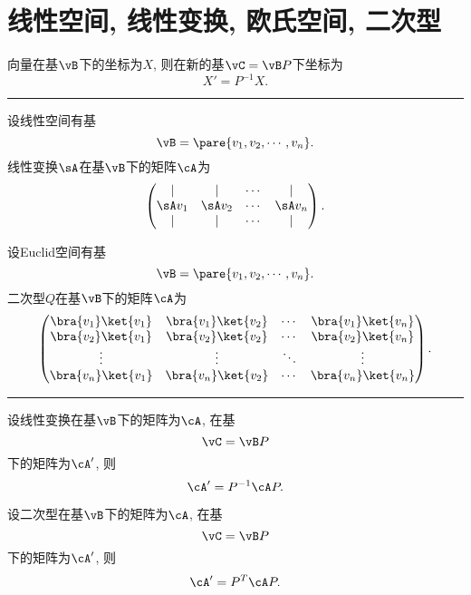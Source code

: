 \documentclass{ctexart}
\begin{document}
\section{线性空间, 线性变换, 欧氏空间, 二次型} %
\label{sec:线性空间_线性变换_欧氏空间_二次型}

\begin{theorem}
    向量在基$\vB$下的坐标为$X$, 则在新的基$\vC = \vB P$下坐标为
    \[ X' = P^{-1}X. \]
\end{theorem}

\hrule

\begin{paracol}{2}

    \begin{theorem}
        设线性空间有基
        \[ \vB=\pare{v_1,v_2,\cdots,v_n}. \]
        线性变换$\sA$在基$\vB$下的矩阵$\cA$为
        \[ \begin{pmatrix}
            \vert & \vert & \cdots & \vert \\
            \sA v_1 & \sA v_2 & \cdots & \sA v_n \\
            \vert & \vert & \cdots & \vert
        \end{pmatrix}. \]
    \end{theorem}

\switchcolumn

    \begin{theorem}
        设Euclid空间有基
        \[ \vB=\pare{v_1,v_2,\cdots,v_n}. \]
        二次型$Q$在基$\vB$下的矩阵$\cA$为
        \[ \begin{pmatrix}
            \bra{v_1}\ket{v_1} & \bra{v_1}\ket{v_2} & \cdots & \bra{v_1}\ket{v_n} \\
            \bra{v_2}\ket{v_1} & \bra{v_2}\ket{v_2} & \cdots & \bra{v_2}\ket{v_n} \\
            \vdots & \vdots & \ddots & \vdots \\
            \bra{v_n}\ket{v_1} & \bra{v_n}\ket{v_2} & \cdots & \bra{v_n}\ket{v_n}
        \end{pmatrix}. \]
    \end{theorem}

\end{paracol}

\hrule

\begin{paracol}{2}

    \begin{theorem}
        设线性变换在基$\vB$下的矩阵为$\cA$, 在基
        \[ \vC = \vB P \]
        下的矩阵为$\cA'$, 则
        \[ \cA' = P^{-1}\cA P. \]
    \end{theorem}

    \switchcolumn

    \begin{theorem}
        设二次型在基$\vB$下的矩阵为$\cA$, 在基
        \[ \vC = \vB P \]
        下的矩阵为$\cA'$, 则
        \[ \cA' = P^T \cA P. \]
    \end{theorem}

\end{paracol}
\end{document}
